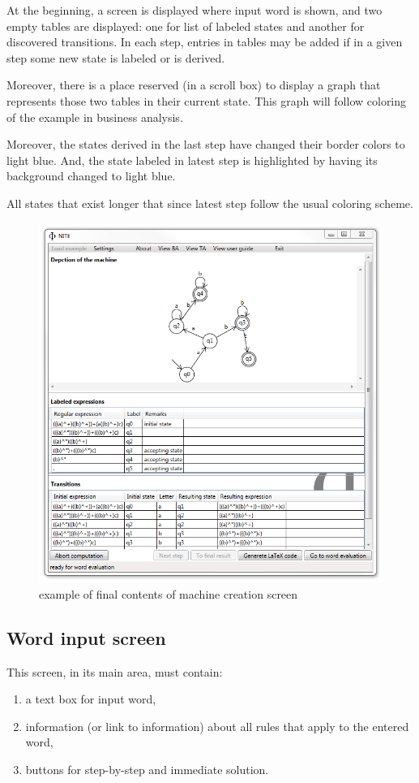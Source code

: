 \documentclass{article}
\begin{document}
\newpage

At the beginning, a screen is displayed where input word is shown, and two empty tables are
displayed: one for list of labeled states and another for discovered transitions. In each step,
entries in tables may be added if in a given step some new state is labeled or is derived.

Moreover, there is a place reserved (in a scroll box) to display a graph that represents those
two tables in their current state. This graph will follow coloring of the example in
business analysis.

Moreover, the states derived in the last step have changed their border colors to light blue. And,
the state labeled in latest step is highlighted by having its background changed to light blue.

All states that exist longer that since latest step follow the usual coloring scheme.

\begin{figure}[ht!]
  \centering
  \includegraphics[width=.9\textwidth]{../../graphics/Screen4.png}
  \caption{example of final contents of machine creation screen}
\end{figure}

\newpage

\subsection{Word input screen}
This screen, in its main area, must contain:
\begin{enumerate}

  \item a text box for input word,

  \item information (or link to information) about all rules that apply to the entered word,

  \item buttons for step-by-step and immediate solution.

\end{enumerate}
\end{document}
